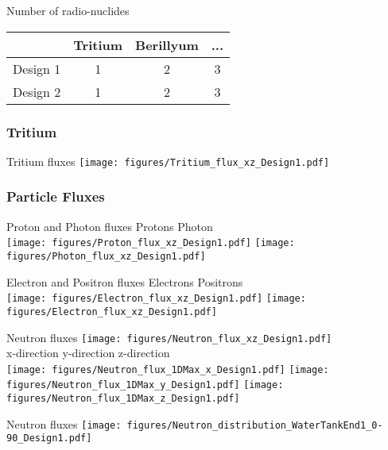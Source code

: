 \documentclass[xcolor={dvipsnames}]{beamer}
\begin{document}
\begin{frame}{Number of radio-nuclides}
\begin{center}
\begin{tabular}{|c|c|c|c|}
\hline
 & Tritium & Berillyum & ... \\
\hline
Design 1 & 1 & 2 & 3\\
\hline
\hline
Design 2 & 1 & 2 & 3\\
\hline
\end{tabular}
\end{center}
\end{frame}

\subsubsection{Tritium}
\begin{frame}{Tritium fluxes}
\centering
  \texttt{[image: figures/Tritium\_flux\_xz\_Design1.pdf]}
\end{frame}

\subsubsection{Particle Fluxes}
\begin{frame}{Proton and Photon fluxes}
\centering
\hspace*{2cm} Protons \hfill Photon \hspace*{2cm} \\
  \texttt{[image: figures/Proton\_flux\_xz\_Design1.pdf]}
  \texttt{[image: figures/Photon\_flux\_xz\_Design1.pdf]}
\end{frame}
\begin{frame}{Electron and Positron fluxes}
\centering
\hspace*{2cm} Electrons \hfill Positrons \hspace*{2cm} \\
  \texttt{[image: figures/Electron\_flux\_xz\_Design1.pdf]}
  \texttt{[image: figures/Electron\_flux\_xz\_Design1.pdf]}
\end{frame}
\begin{frame}{Neutron fluxes}
\centering
  \texttt{[image: figures/Neutron\_flux\_xz\_Design1.pdf]}\\
  \centering
\hspace*{1.6cm} x-direction \hfill y-direction \hfill z-direction \hspace*{1.8cm} \\
  \texttt{[image: figures/Neutron\_flux\_1DMax\_x\_Design1.pdf]}\hfill
  \texttt{[image: figures/Neutron\_flux\_1DMax\_y\_Design1.pdf]}\hfill
  \texttt{[image: figures/Neutron\_flux\_1DMax\_z\_Design1.pdf]}
\end{frame}
\begin{frame}{Neutron fluxes}
\centering
  \texttt{[image: figures/Neutron\_distribution\_WaterTankEnd1\_0-90\_Design1.pdf]}
\end{frame}
\end{document}
